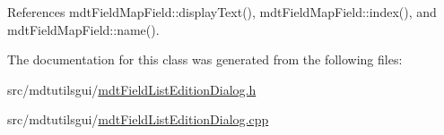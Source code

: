 References mdt\-Field\-Map\-Field\-::display\-Text(), mdt\-Field\-Map\-Field\-::index(), and mdt\-Field\-Map\-Field\-::name().



The documentation for this class was generated from the following files\-:\begin{DoxyCompactItemize}
\item 
src/mdtutilsgui/\hyperlink{mdt_field_list_edition_dialog_8h}{mdt\-Field\-List\-Edition\-Dialog.\-h}\item 
src/mdtutilsgui/\hyperlink{mdt_field_list_edition_dialog_8cpp}{mdt\-Field\-List\-Edition\-Dialog.\-cpp}\end{DoxyCompactItemize}
